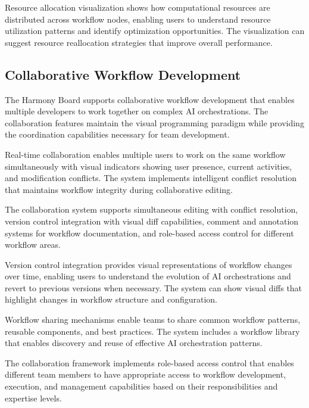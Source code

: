 Resource allocation visualization shows how computational resources are distributed across workflow nodes, enabling users to understand resource utilization patterns and identify optimization opportunities. The visualization can suggest resource reallocation strategies that improve overall performance.

\subsection*{Collaborative Workflow Development}

The Harmony Board supports collaborative workflow development that enables multiple developers to work together on complex AI orchestrations. The collaboration features maintain the visual programming paradigm while providing the coordination capabilities necessary for team development.

Real-time collaboration enables multiple users to work on the same workflow simultaneously with visual indicators showing user presence, current activities, and modification conflicts. The system implements intelligent conflict resolution that maintains workflow integrity during collaborative editing.

\begin{infobox}[title=Collaboration Features]
The collaboration system supports simultaneous editing with conflict resolution, version control integration with visual diff capabilities, comment and annotation systems for workflow documentation, and role-based access control for different workflow areas.
\end{infobox}

Version control integration provides visual representations of workflow changes over time, enabling users to understand the evolution of AI orchestrations and revert to previous versions when necessary. The system can show visual diffs that highlight changes in workflow structure and configuration.

Workflow sharing mechanisms enable teams to share common workflow patterns, reusable components, and best practices. The system includes a workflow library that enables discovery and reuse of effective AI orchestration patterns.

The collaboration framework implements role-based access control that enables different team members to have appropriate access to workflow development, execution, and management capabilities based on their responsibilities and expertise levels.

